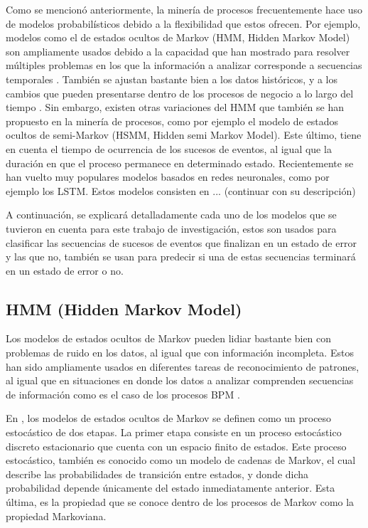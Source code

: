 Como se mencionó anteriormente, la minería de procesos frecuentemente hace uso de modelos probabilísticos debido a la flexibilidad que estos ofrecen. Por ejemplo, modelos como el de estados ocultos de Markov (HMM, Hidden Markov Model) son ampliamente usados debido a la capacidad que han mostrado para resolver múltiples problemas en los que la información a analizar corresponde a secuencias temporales \cite{DaSilva2009}. También se ajustan bastante bien a los datos históricos, y a los cambios que pueden presentarse dentro de los procesos de negocio a lo largo del tiempo \cite{Rozinat2008}. Sin embargo, existen otras variaciones del HMM que también se han propuesto en la minería de procesos, como por ejemplo el modelo de estados ocultos de semi-Markov (HSMM, Hidden semi Markov Model). Este último, tiene en cuenta el tiempo de ocurrencia de los sucesos de eventos, al igual que la duración en que el proceso permanece en determinado estado. Recientemente se han vuelto muy populares modelos basados en redes neuronales, como por ejemplo los LSTM. Estos modelos consisten en ... (continuar con su descripción)

A continuación, se explicará detalladamente cada uno de los modelos que se tuvieron en cuenta para este trabajo de investigación, estos son usados para clasificar las secuencias de sucesos de eventos que finalizan en un estado de error y las que no, también se usan para predecir si una de estas secuencias terminará en un estado de error o no.

\subsection{HMM (Hidden Markov Model) }

Los modelos de estados ocultos de Markov pueden lidiar bastante bien con problemas de ruido en los datos, al igual que con información incompleta. Estos han sido ampliamente usados en diferentes tareas de reconocimiento de patrones, al igual que en situaciones en donde los datos a analizar comprenden secuencias de información como es el caso de los procesos BPM \cite{Pandey2011}. %

En \cite{Fink2014}, los modelos de estados ocultos de Markov se definen como un proceso estocástico de dos etapas. La primer etapa consiste en un proceso estocástico discreto estacionario que cuenta con un espacio finito de estados. Este proceso estocástico, también es conocido como un modelo de cadenas de Markov, el cual describe las probabilidades de transición entre estados, y donde dicha probabilidad depende únicamente del estado inmediatamente anterior. Esta última, es la propiedad que se conoce dentro de los procesos de Markov como la propiedad Markoviana. 

